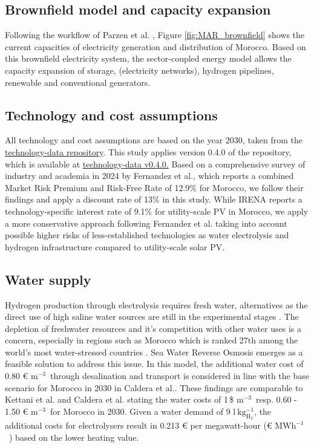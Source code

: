 \documentclass[5p,numafflabel]{elsarticle}
\newcommand{\eurMWh}{€ \ensuremath{\mathrm{MWh^{-1}}}~}
\newcommand{\eurcubicm}{€ \ensuremath{\mathrm{m^{-3}}}~}
\newcommand{\usdcubicm}{\$ \ensuremath{\mathrm{m^{-3}}}~}
\newcommand{\lkgHtwo}{\ensuremath{\mathrm{l~kg^{-1}_{H_2}}}}
\begin{document}
\subsection*{Brownfield model and capacity expansion}
\label{brownfield_model}
Following the workflow of Parzen et al. \cite{Parzen2023}, Figure \ref{fig:MAR_brownfield} shows the current capacities of electricity generation and distribution of Morocco. Based on this brownfield electricity system, the sector-coupled energy model allows the capacity expansion of storage, (electricity networks), hydrogen pipelines, renewable and conventional generators.

\subsection*{Technology and cost assumptions}
\label{subsec:tech_assump}
All technology and cost assumptions are based on the year 2030, taken from the \href{https://github.com/pypsa/technology-data}{technology-data repository}. This study applies version 0.4.0 of the repository, which is available at \href{https://github.com/PyPSA/technology-data/blob/v0.4.0/outputs/costs_2030.csv}{technology-data v0.4.0.}
Based on a comprehensive survey of industry and academia in 2024 by Fernandez et al.\cite{Fernandez2024}, which reports a combined Market Risk Premium and Risk-Free Rate of 12.9\% for Morocco, we follow their findings and apply a discount rate of 13\% in this study. While IRENA\cite{IRENA2023} reports a technology-specific interest rate of 9.1\% for utility-scale PV in Morocco, we apply a more conservative approach following Fernandez et al.\cite{Fernandez2024} taking into account possible higher risks of less-established technologies as water electrolysis and hydrogen infrastructure compared to utility-scale solar PV.



\subsection*{Water supply}
\label{subsec:water_supply}
Hydrogen production through electrolysis requires fresh water, alternatives as the direct use of high saline water sources are still in the experimental stages \cite{Tong2020}. The depletion of freshwater resources and it's competition with other water uses is a concern, especially in regions such as Morocco which is ranked 27th among the world's most water-stressed countries \cite{Maddocks2015}. 
Sea Water Reverse Osmosis emerges as a feasible solution to address this issue. In this model, the additional water cost of 0.80 \eurcubicm through desalination and transport is considered in line with the base scenario for Morocco in 2030 in Caldera et al.\cite{Caldera2020}. These findings are comparable to Kettani et al.\cite{Kettani2020} and Caldera et al.\cite{Caldera2016} stating the water costs of 1\,\usdcubicm resp. 0.60 - 1.50 \eurcubicm for Morocco in 2030. Given a water demand of 9 \lkgHtwo \cite{Hampp2023}, the additional costs for electrolysers result in 0.213 € per megawatt-hour (\eurMWh) based on the lower heating value.
\end{document}

